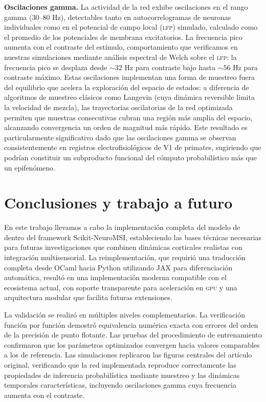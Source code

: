 \documentclass{llncs}
\begin{document}
\textbf{Oscilaciones gamma.} La actividad de la red exhibe
oscilaciones en el rango gamma (30--80 Hz), detectables tanto en
autocorrelogramas de neuronas individuales como en el potencial de
campo local (\textsc{lfp}) simulado, calculado como el promedio de
los potenciales de membrana excitatorios. La frecuencia pico aumenta
con el contraste del estímulo, comportamiento que verificamos en
nuestras simulaciones mediante análisis espectral de Welch sobre el
\textsc{lfp}: la frecuencia pico se desplaza desde $\sim 32$ Hz para
contraste bajo hasta $\sim 56$ Hz para contraste máximo. Estas
oscilaciones implementan una forma de muestreo fuera del equilibrio
que acelera la exploración del espacio de estados: a diferencia de
algoritmos de muestreo clásicos como Langevin (cuya dinámica
reversible limita la velocidad de mezcla), las trayectorias
oscilatorias de la red optimizada permiten que muestras consecutivas
cubran una región más amplia del espacio, alcanzando convergencia un
orden de magnitud más rápido. Este resultado es particularmente
significativo dado que las oscilaciones gamma se observan
consistentemente en registros electrofisiológicos de V1 de primates,
sugiriendo que podrían constituir un subproducto funcional del
cómputo probabilístico más que un epifenómeno.

\section{Conclusiones y trabajo a futuro}

En este trabajo llevamos a cabo la implementación completa del
modelo de \citet{echeveste2020cortical} dentro del framework
Scikit-NeuroMSI, estableciendo las bases técnicas necesarias para
futuras investigaciones que combinen dinámicas corticales realistas
con integración multisensorial. La reimplementación, que requirió
una traducción completa desde OCaml hacia Python utilizando JAX para
diferenciación automática, resultó en una implementación moderna
compatible con el ecosistema actual, con soporte transparente para
aceleración en \textsc{gpu} y una arquitectura modular que facilita
futuras extensiones.

La validación se realizó en múltiples niveles complementarios. La
verificación función por función demostró equivalencia numérica
exacta con errores del orden de la precisión de punto flotante. Las
pruebas del procedimiento de entrenamiento confirmaron que los
parámetros optimizados convergen hacia valores comparables a los de
referencia. Las simulaciones replicaron las figuras centrales del
artículo original, verificando que la red implementada reproduce
correctamente las propiedades de inferencia probabilística mediante
muestreo y las dinámicas temporales características, incluyendo
oscilaciones gamma cuya frecuencia aumenta con el contraste.
\end{document}
